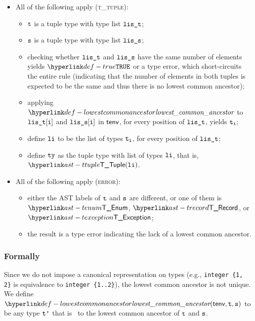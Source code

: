 \begin{itemize}
\begin{itemize}
    \item All of the following apply (\textsc{t\_tuple}):
    \begin{itemize}
      \item $\texttt{t}$ is a tuple type with type list $\texttt{lis\_t}$;
      \item $\texttt{s}$ is a tuple type with type list $\texttt{lis\_s}$;
      \item checking whether $\texttt{lis\_t}$ and $\texttt{lis\_s}$ have the same number of elements yields $\True$
            or a type error, which short-circuits the entire rule (indicating that the number of elements in both tuples is expected
            to be the same and thus there is no lowest common ancestor);
      \item applying $\lca$ to $\texttt{lis\_t}[\texttt{i}]$ and $\texttt{lis\_s}[\texttt{i}]$ in $\textsf{tenv}$, for every position of $\texttt{lis\_t}$,
            yields $\texttt{t}_{\texttt{i}}$\ProseOrTypeError;
      \item define $\texttt{li}$ to be the list of types $\texttt{t}_{\texttt{i}}$, for every position of $\texttt{lis\_t}$;
      \item define $\texttt{ty}$ as the tuple type with list of types $\texttt{li}$, that is, $\TTuple(\vli)$.
    \end{itemize}

    \item All of the following apply (\textsc{error}):
    \begin{itemize}
      \item either the AST labels of $\texttt{t}$ and $\texttt{s}$ are different, or one of them is $\TEnum$, $\TRecord$, or $\TException$;
      \item the result is a type error indicating the lack of a lowest common ancestor.
    \end{itemize}
  \end{itemize}
\end{itemize}



\subsubsection{Formally}
Since we do not impose a canonical representation on types (e.g., \verb|integer {1, 2}| is equivalence to \verb|integer {1..2}|),
the lowest common ancestor is not unique.
We define $\lca(\tenv, \vt, \vs)$ to be any type $\texttt{t'}$ that is \typeequivalent\ to the lowest common ancestor of $\texttt{t}$ and $\texttt{s}$.

